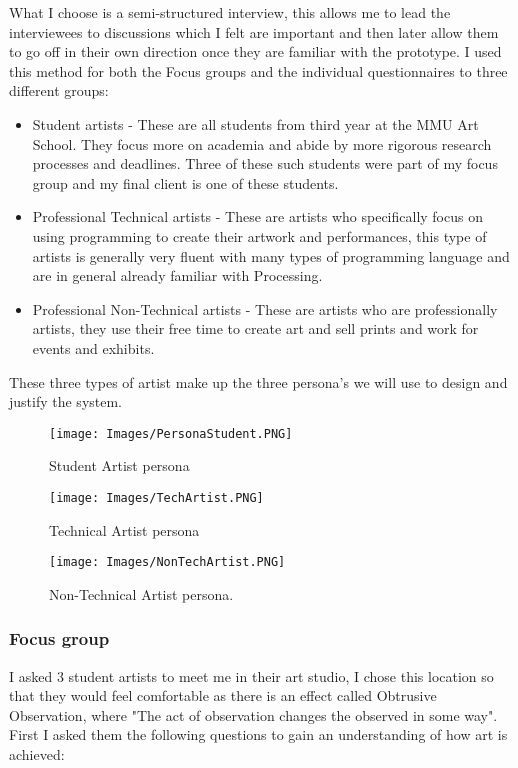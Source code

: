 \documentclass[a4paper]{report}
\begin{document}
What I choose is a semi-structured interview, this allows me to lead the interviewees to discussions which I felt are important and then later allow them to go off in their own direction once they are familiar with the prototype. I used this method for both the Focus groups and the individual questionnaires to three different groups:

\begin{itemize}
\item Student artists - These are all students from third year at the MMU Art School. They focus more on academia and abide by more rigorous research processes and deadlines. Three of these such students were part of my focus group and my final client is one of these students.
\item Professional Technical artists - These are artists who specifically focus on using programming to create their artwork and performances, this type of artists is generally very fluent with many types of programming language and are in general already familiar with Processing\cite{PROCESSING}.
\item Professional Non-Technical artists - These are artists who are professionally artists, they use their free time to create art and sell prints and work for events and exhibits.
\end{itemize}

These three types of artist make up the three persona's we will use to design and justify the system.

\begin{figure}[!ht]
\centering
\texttt{[image: Images/PersonaStudent.PNG]}
\caption{\label{fig:PersonaStudent} Student Artist persona}
\end{figure}

\begin{figure}[!ht]
\centering
\texttt{[image: Images/TechArtist.PNG]}
\caption{\label{fig:TechArtist} Technical Artist persona}
\end{figure}

\begin{figure}[!ht]
\centering
\texttt{[image: Images/NonTechArtist.PNG]}
\caption{\label{fig:NonTechArtist} Non-Technical Artist persona.}
\end{figure}

\clearpage
\subsubsection{Focus group}
I asked 3 student artists to meet me in their art studio, I chose this location so that they would feel comfortable as there is an effect called Obtrusive Observation, where "The act of observation changes the observed in some way"\cite{UX}. First I asked them the following questions to gain an understanding of how art is achieved:
\end{document}
